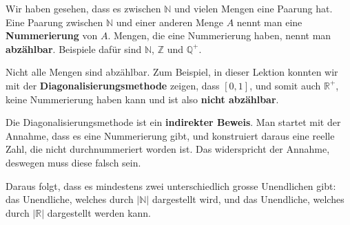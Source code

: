 \documentclass[
	12pt, %
	german, %
]{fphw}
\newcommand{\keyword}[1]{\textbf{#1}}
\begin{document}
Wir haben gesehen, dass es zwischen \(\mathbb{N}\) und vielen Mengen eine Paarung hat. Eine Paarung zwischen \(\mathbb{N}\) und einer anderen Menge \(A\) nennt man eine \keyword{Nummerierung} von \(A\). Mengen, die eine Nummerierung haben, nennt man \keyword{abzählbar}. Beispiele dafür sind \(\mathbb{N}\), \(\mathbb{Z}\) und \(\mathbb{Q^+}\).

Nicht alle Mengen sind abzählbar. Zum Beispiel, in dieser Lektion konnten wir mit der \keyword{Diagonalisierungsmethode} zeigen, dass \([0,1]\), und somit auch \(\mathbb{R^+}\), keine Nummerierung haben kann und ist also \keyword{nicht abzählbar}.

Die Diagonalisierungsmethode ist ein \keyword{indirekter Beweis}. Man startet mit der Annahme, dass es eine Nummerierung gibt, und konstruiert daraus eine reelle Zahl, die nicht durchnummeriert worden ist. Das widerspricht der Annahme, deswegen muss diese falsch sein.

Daraus folgt, dass es mindestens zwei unterschiedlich grosse Unendlichen gibt: das Unendliche, welches durch \(|\mathbb{N}|\) dargestellt wird, und das Unendliche, welches durch \(|\mathbb{R}|\) dargestellt werden kann.
\end{document}
